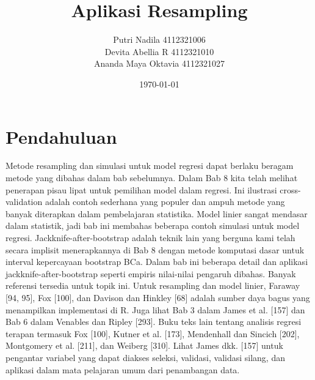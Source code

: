 \documentclass[a4paper,12pt]{article}
\theoremstyle{definition}
\begin{document}
    \title{Aplikasi Resampling}
    \author{Putri Nadila 4112321006\\
    Devita Abellia R 4112321010\\
    Ananda Maya Oktavia 4112321027}
\date{\today}
\begin{titlepage}
    \maketitle
\end{titlepage}

\section{Pendahuluan}
Metode resampling dan simulasi untuk model regresi dapat berlaku beragam metode yang dibahas dalam bab sebelumnya. Dalam Bab 8 kita telah melihat penerapan pisau lipat untuk pemilihan model dalam regresi. Ini ilustrasi cross-validation adalah contoh sederhana yang populer dan ampuh metode yang banyak diterapkan dalam pembelajaran statistika. Model linier sangat mendasar dalam statistik, jadi bab ini membahas beberapa contoh simulasi untuk
model regresi. Jackknife-after-bootstrap adalah teknik lain yang berguna kami telah secara implisit menerapkannya di Bab 8 dengan metode komputasi dasar untuk interval kepercayaan bootstrap BCa. Dalam bab ini beberapa detail dan aplikasi jackknife-after-bootstrap seperti empiris nilai-nilai pengaruh dibahas. Banyak referensi tersedia untuk topik ini. Untuk resampling dan model linier, Faraway [94, 95], Fox [100], dan Davison dan Hinkley [68] adalah sumber daya bagus yang menampilkan implementasi di R. Juga lihat Bab 3 dalam James et al. [157] dan Bab 6 dalam Venables dan Ripley [293]. Buku teks lain tentang analisis regresi terapan termasuk Fox [100], Kutner et al. [173], Mendenhall dan Sincich [202], Montgomery et al. [211], dan Weiberg [310]. Lihat James dkk. [157] untuk pengantar variabel yang dapat diakses seleksi, validasi, validasi silang, dan aplikasi dalam mata pelajaran umum dari penambangan data.
\end{document}
